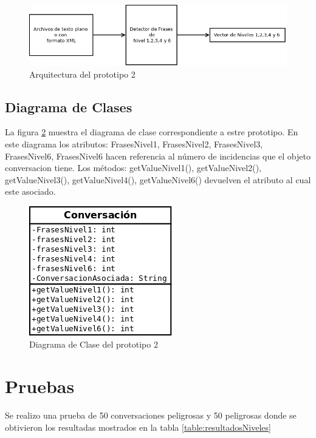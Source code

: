 \begin{center}
	\begin{figure}[!h]
	\includegraphics[scale=.5]{images/arquitecturaprototipo2}
	\caption{Arquitectura del prototipo 2}
	\label{fig:arquitectura_prototipo2}
	\end{figure}
\end{center}

\subsection{Diagrama de Clases}


La figura \ref{fig:diagramaDeClase} muestra el diagrama de clase correspondiente a estre prototipo. En este diagrama los atributos: FrasesNivel1, FrasesNivel2, FrasesNivel3, FrasesNivel6, FrasesNivel6 hacen referencia al n\'umero de incidencias que el objeto conversacion tiene. Los m\'etodos: getValueNivel1(), getValueNivel2(), getValueNivel3(), getValueNivel4(), getValueNivel6() devuelven el atributo al cual este asociado.
	\begin{figure}[h]
	\begin{center}
	\includegraphics[scale=.4]{images/claseprotipo2}
	\caption{Diagrama de Clase del prototipo 2}
	\label{fig:diagramaDeClase}
	\end{center}
	\end{figure}
\section{Pruebas}


Se realizo una prueba de 50 conversaciones peligrosas y 50 peligrosas donde se obtivieron los resultadas mostrados en la tabla \ref{table:resultadosNiveles}



